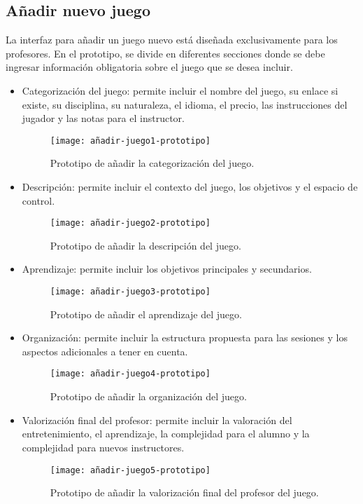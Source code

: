 \subsection{Añadir nuevo juego}
La interfaz para añadir un juego nuevo está diseñada exclusivamente para los profesores. En el prototipo, se divide en diferentes secciones donde se debe ingresar información obligatoria sobre el juego que se desea incluir.

\begin{itemize}
    \item Categorización del juego: permite incluir el nombre del juego, su enlace si existe, su disciplina, su naturaleza, el idioma, el precio, las instrucciones del jugador y las notas para el instructor.
    \begin{figure}[htb]
    \centering
    \texttt{[image: añadir-juego1-prototipo]}
    \caption{Prototipo de añadir la categorización del juego.}
    \label{fig:añadir-juego1-prototipo}
    \end{figure}
    \newpage
    \item Descripción: permite incluir el contexto del juego, los objetivos y el espacio de control.
    \begin{figure}[htb]
    \centering
    \texttt{[image: añadir-juego2-prototipo]}
    \caption{Prototipo de añadir la descripción del juego.}
    \label{fig:añadir-juego2-prototipo}
    \end{figure}
 
    \item Aprendizaje: permite incluir los objetivos principales y secundarios.
    \begin{figure}[htb]
    \centering
    \texttt{[image: añadir-juego3-prototipo]}
    \caption{Prototipo de añadir el aprendizaje del juego.}
    \label{fig:añadir-juego3-prototipo}
    \end{figure}
    \newpage
    \item Organización: permite incluir la estructura propuesta para las sesiones y los aspectos adicionales a tener en cuenta.
    \begin{figure}[htb]
    \centering
    \texttt{[image: añadir-juego4-prototipo]}
    \caption{Prototipo de añadir la organización del juego.}
    \label{fig:añadir-juego4-prototipo}
    \end{figure}

    \item Valorización final del profesor: permite incluir la valoración del entretenimiento, el aprendizaje, la complejidad para el alumno y la complejidad para nuevos instructores.
    \begin{figure}[htb]
    \centering
    \texttt{[image: añadir-juego5-prototipo]}
    \caption{Prototipo de añadir la valorización final del profesor del juego.}
    \label{fig:añadir-juego5-prototipo}
    \end{figure}
\end{itemize}
\newpage

